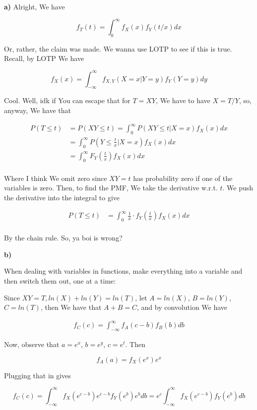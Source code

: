 \documentclass{article}
\begin{document}
			\textbf{a)} Alright, We have
			
			\[ f_T(t) = \int_0^\infty f_X(x)f_Y(t/x) dx \]
			
			Or, rather, the claim was made. We wanna use LOTP to see if this is true. Recall, by LOTP We have
			
			\[ f_X(x) = \int^\infty_{-\infty} f_{X, Y}(X=x|Y=y)f_Y(Y=y) dy \]
			
			Cool. Well, idk if You can escape that for $T=XY$, We have to have $X=T/Y$, so, anyway, We have that
			
			\begin{align*}
			P(T\le t) &= P(XY\le t) = \int^\infty_0 P(XY\le t|X=x)f_X(x)dx\\
			&= \int^\infty_0 P(Y\le \frac{t}{x}|X=x)f_X(x)dx\\
			&= \int^\infty_0 F_Y\left(\frac{t}{x}\right)f_X(x)dx\\
			\end{align*}
			
			Where I think We omit zero since $XY=t$ has probability zero if one of the variables is zero. Then, to find the PMF, We take the derivative w.r.t. $t$. We push the derivative into the integral to give 
			
			\begin{align*}
			P(T\le t) &= \int^\infty_0 \frac{1}{x}\cdot f_Y\left(\frac{t}{x}\right)f_X(x)dx\\
			\end{align*}
			
		 	By the chain rule. So, ya boi is wrong?
		 	
		 	\textbf{b)}
		 	
		 	When dealing with variables in functions, make everything into a variable and then switch them out, one at a time:
		 	
		 	Since $XY=T, ln(X)+ln(Y)=ln(T)$, let $A=ln(X)$, $B=ln(Y)$, $C=ln(T)$, then We have that $A+B=C$, and by convolution We have
		 	
		 	\begin{align*}
		 	f_C(c) = \int^\infty_{-\infty} f_A(c-b)f_B(b) db
		 	\end{align*}
		 	
		 	Now, observe that $a=e^x$, $b=e^y$, $c=e^t$. Then
		 	
		 	\[ f_A(a) = f_X(e^x)e^x \]
		 	
		 	Plugging that in gives
		 	
		 	\[ f_C(c) = \int^\infty_{-\infty} f_X(e^{c-b})e^{c-b}f_Y(e^b)e^b db = e^{c}\int^\infty_{-\infty} f_X(e^{c-b})f_Y(e^b) db \]
		
\end{document}
